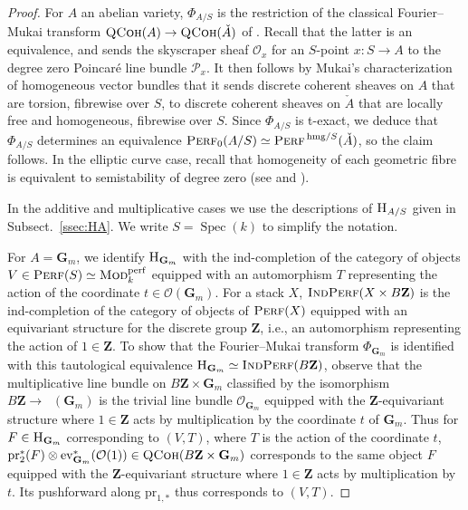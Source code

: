 \documentclass[12pt, oneside]{amsart}
\numberwithin{equation}{section}
\theoremstyle{remark}
\theoremstyle{plain}
\newcommand{\Mod}{\textsc{Mod}}
\DeclareMathOperator{\QCoh}{\textsc{QCoh}}
\DeclareMathOperator{\Perf}{\textsc{Perf}}
\DeclareMathOperator{\IndPerf}{\textsc{IndPerf}}
\newcommand{\Hcat}{\textup{\textsc{H}}}
\newcommand{\HAS}{\Hcat_{A/S}}
\DeclareMathOperator{\CharOne}{\chi^{(1)}}
\newcommand{\OO}{\mathcal{O}}
\DeclareMathOperator{\spc}{Spec}
\newcommand{\GGm}{\mathbf{G}_{m}}
\newcommand{\GM}{\mathbf{G}_{m}}
\newcommand{\bZ}{\mathbf{Z}}
\newcommand{\pr}{\mathrm{pr}}
\newcommand{\ev}{\mathrm{ev}}
\begin{document}
\begin{proof}

  For $A$ an abelian variety, $\Phi_{A/S}$ is the restriction of the classical Fourier--Mukai transform $\QCoh(A) \to \QCoh(\check{A})$ of \cite{Mukai}.
  Recall that the latter is an equivalence, and sends the skyscraper sheaf $\OO_x$ for an $S$-point $x : S \to A$ to the degree zero Poincar\'e line bundle $\mathcal{P}_x$.
  It then follows by Mukai's characterization of homogeneous vector bundles \cite[Exam.~3.2]{Mukai} that it sends discrete coherent sheaves on $A$ that are torsion, fibrewise over $S$, to discrete coherent sheaves on $\check{A}$ that are locally free and homogeneous, fibrewise over $S$.
  Since $\Phi_{A/S}$ is t-exact, we deduce that $\Phi_{A/S}$ determines an equivalence $\Perf_0(A/S) \simeq \Perf^{\,\text{hmg}/S}(\check{A})$, so the claim follows.
  In the elliptic curve case, recall that homogeneity of each geometric fibre is equivalent to semistability of degree zero (see \cite[p.~159]{Mukai} and \cite[Thm.~5]{At}).

  In the additive and multiplicative cases we use the descriptions of $\HAS$ given in Subsect.~\ref{ssec:HA}.
  We write $S=\spc(k)$ to simplify the notation.

  For $A=\GGm$, we identify $\Hcat_{\GM}$ with the ind-completion of the category of objects $V \in \Perf(S)\simeq \Mod_{k}^{\mathrm{perf}}$ equipped with an automorphism $T$ representing the action of the coordinate $t \in \OO(\GGm)$.
  For a stack $X$, $\IndPerf(X \times B\bZ)$ is the ind-completion of the category of objects of $\Perf(X)$ equipped with an equivariant structure for the discrete group $\bZ$, i.e., an automorphism representing the action of $1 \in \bZ$.
  To show that the Fourier--Mukai transform $\Phi_{\GGm}$ is identified with this tautological equivalence $\Hcat_{\GM} \simeq \IndPerf(B\bZ)$, observe that the multiplicative line bundle on $B\bZ \times \GGm$ classified by the isomorphism $B\bZ \to \CharOne(\GGm)$ is the trivial line bundle $\OO_{\GGm}$ equipped with the $\bZ$-equivariant structure where $1 \in \bZ$ acts by multiplication by the coordinate $t$ of $\GGm$.
  Thus for $F \in \Hcat_{\GGm}$ corresponding to $(V,T)$, where $T$ is the action of the coordinate $t$, $\pr_2^*(F) \otimes \ev_{\GGm}^*(\OO(1)) \in \QCoh(B\bZ \times \GGm)$ corresponds to the same object $F$ equipped with the $\bZ$-equivariant structure where $1\in\bZ$ acts by multiplication by $t$.
  Its pushforward along $\pr_{1,*}$ thus corresponds to $(V,T)$.


\end{proof}
\end{document}
